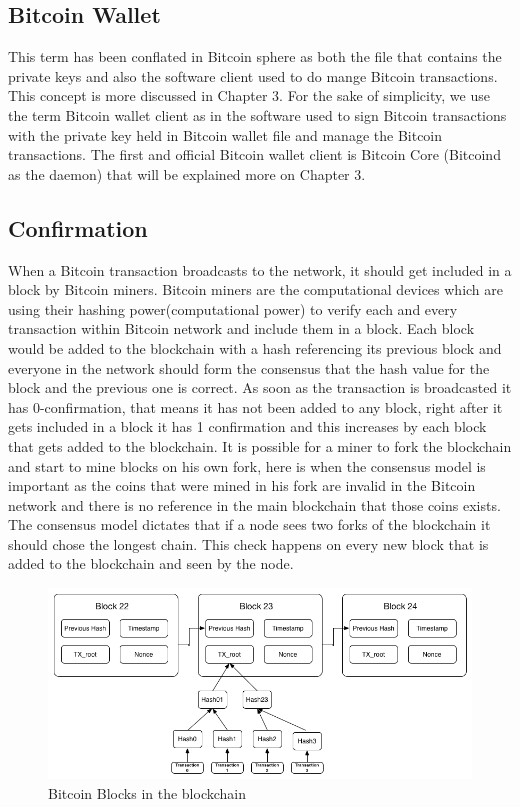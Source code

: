 \subsection{Bitcoin Wallet}
This term has been conflated in Bitcoin sphere as both the file that contains the private keys and also the software client used to do mange Bitcoin transactions. This concept is more discussed in Chapter 3. For the sake of simplicity, we use the term Bitcoin wallet client as in the software used to sign Bitcoin transactions with the private key held in Bitcoin wallet file and manage the Bitcoin transactions.
The first and official Bitcoin wallet client is Bitcoin Core (Bitcoind as the daemon) that will be explained more on Chapter 3.


\subsection{Confirmation}
When a Bitcoin transaction broadcasts to the network, it should get included in a block by Bitcoin miners. Bitcoin miners are the computational devices which are using their hashing power(computational power) to verify each and every transaction within Bitcoin network and include them in a block. Each block would be added to the blockchain with a hash referencing its previous block and everyone in the network should form the consensus that the hash value for the block and the previous one is correct. As soon as the transaction is broadcasted it has 0-confirmation, that means it has not been added to any block, right after it gets included in a block it has 1 confirmation and this increases by each block that gets added to the blockchain.
It is possible for a miner to fork the blockchain and start to mine blocks on his own fork, here is when the consensus model is important as the coins that were mined in his fork are invalid in the Bitcoin network and there is no reference in the main blockchain that those coins exists. The consensus model dictates that if a node sees two forks of the blockchain it should chose the longest chain. This check happens on every new block that is added to the blockchain and seen by the node.

\begin{figure}[htb]
\centering
\includegraphics[width=\linewidth]{fig/bitcoinblocks.png}
  \caption{Bitcoin Blocks in the blockchain ~\cite{Nak08}}
\label{fig:bitcoinblocks}
\end{figure}

